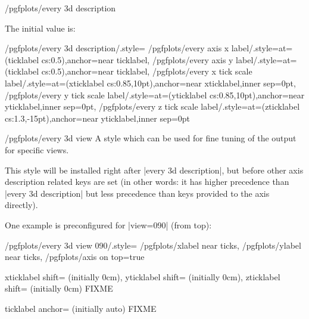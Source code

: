 \begin{stylekey}{/pgfplots/every 3d description}

	The initial value is:
\begin{codeexample}
/pgfplots/every 3d description/.style={%
	/pgfplots/every axis x label/.style={at={(ticklabel cs:0.5)},anchor=near ticklabel},
	/pgfplots/every axis y label/.style={at={(ticklabel cs:0.5)},anchor=near ticklabel},
	/pgfplots/every x tick scale label/.style={at={(xticklabel cs:0.85,10pt)},anchor=near xticklabel,inner sep=0pt},
	/pgfplots/every y tick scale label/.style={at={(yticklabel cs:0.85,10pt)},anchor=near yticklabel,inner sep=0pt},
	/pgfplots/every z tick scale label/.style={at={(zticklabel cs:1.3,-15pt)},anchor=near yticklabel,inner sep=0pt}
}%
\end{codeexample}
\end{stylekey}

\begin{stylekey}{/pgfplots/every 3d view }
	A style which can be used for fine tuning of the output for specific views.

	This style will be installed right after |every 3d description|, but before other axis description related keys are set (in other words: it has higher precedence than |every 3d description| but less precedence than keys provided to the axis directly).

	One example is preconfigured for |view={0}{90}| (from top):
\begin{codeexample}
/pgfplots/every 3d view {0}{90}/.style={
	/pgfplots/xlabel near ticks,
	/pgfplots/ylabel near ticks,
	/pgfplots/axis on top=true
}
\end{codeexample}
\end{stylekey}

\begin{pgfplotskeylist}{%
	xticklabel shift= (initially 0cm),%
	yticklabel shift= (initially 0cm),%
	zticklabel shift= (initially 0cm)}
	FIXME
\end{pgfplotskeylist}

\begin{pgfplotsxykey}{\x ticklabel anchor= (initially auto)}
	FIXME
\end{pgfplotsxykey}

